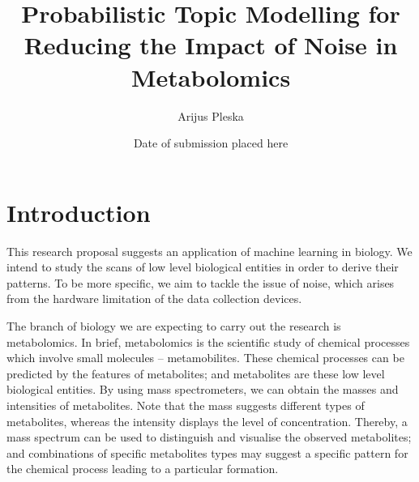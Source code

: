 \documentclass{mprop}
\begin{document}
\title{Probabilistic Topic Modelling for Reducing the Impact of Noise in Metabolomics}
\author{Arijus Pleska}
\date{Date of submission placed here}
\maketitle

\tableofcontents
\newpage



\section{Introduction}

\par This research proposal suggests an application of machine learning in biology. We intend to study the scans of low level biological entities in order to derive their patterns. To be more specific, we aim to tackle the issue of noise, which arises from the hardware limitation of the data collection devices.   

\par The branch of biology we are expecting to carry out the research is metabolomics. In brief, metabolomics is the scientific study of chemical processes which involve small molecules -- metamobilites. These chemical processes can be predicted by the features of metabolites; and metabolites are these low level biological entities. By using mass spectrometers, we can obtain the masses and intensities of metabolites. Note that the mass suggests different types of metabolites, whereas the intensity displays the level of concentration. Thereby, a mass spectrum can be used to distinguish and visualise the observed metabolites; and combinations of specific metabolites types   may suggest a specific pattern for the chemical process leading to a particular formation. 
\end{document}
